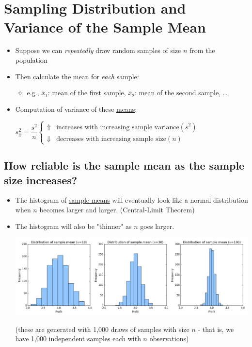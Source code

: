 \documentclass[10pt,article]{article}
\begin{document}
\section{Sampling Distribution and Variance of the Sample Mean}
\label{sec:org473deec}
\begin{itemize}
\item Suppose we can \emph{repeatedly} draw random samples of size \(n\) from the population
\item Then calculate the mean for \emph{each} sample:

\begin{itemize}
\item e.g., \(\bar{x}_1\): mean of the first sample, \(\bar{x}_2\): mean of
the second sample, \ldots{}
\end{itemize}

\item Computation of variance of these \uline{means}:

\(s^2_{\bar{x}} = \dfrac{s^2}{n} \begin{cases} 
       \Uparrow &  \text{increases with increasing sample variance} (s^2) \\
       \Downarrow & \text{decreases with increasing sample size} (n)
       \end{cases}\)
\end{itemize}

\subsection{How reliable is the sample mean as the sample size increases?}
\label{sec:org9d5a6c7}
\begin{itemize}
\item The histogram of \uline{sample means} will eventually look like a normal
distribution when \(n\) becomes larger and larger. (Central-Limit Theorem)
\item The histogram will also be "thinner" as \(n\) goes larger.

\begin{center}
\includegraphics[width=13cm]{../../../Assets/Images/Statistics/hist_mean_n.png}
\end{center}

(these are generated with 1,000 draws of samples with size \(n\) - that
is, we have 1,000 independent samples each with \(n\) observations)
\end{itemize}
\end{document}
